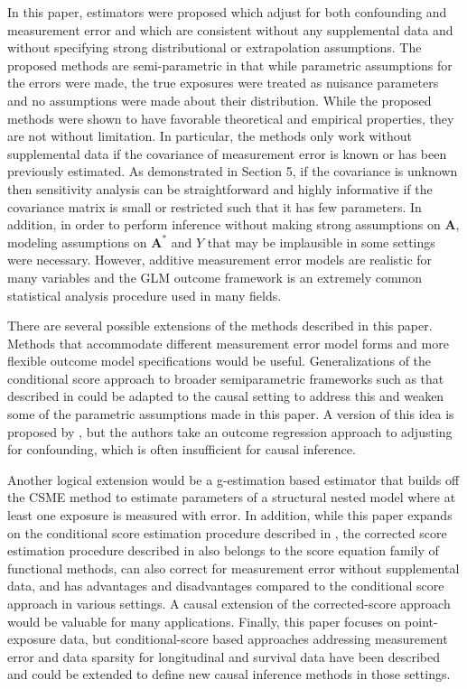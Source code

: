 \documentclass[useAMS,usenatbib,referee]{biom}
\begin{document}
In this paper, estimators were proposed which adjust for both confounding and measurement error and which are consistent without any supplemental data and without specifying strong distributional or extrapolation assumptions. The proposed methods are semi-parametric in that while parametric assumptions for the errors were made, the true exposures were treated as nuisance parameters and no assumptions were made about their distribution. While the proposed methods were shown to have favorable theoretical and empirical properties, they are not without limitation. In particular, the methods only work without supplemental data if the covariance of measurement error is known or has been previously estimated. As demonstrated in Section 5, if the covariance is unknown then sensitivity analysis can be straightforward and highly informative if the covariance matrix is small or restricted such that it has few parameters. In addition, in order to perform inference without making strong assumptions on $\bm{A}$, modeling assumptions on $\bm{A}^{*}$ and $Y$ that may be implausible in some settings were necessary. However, additive measurement error models are realistic for many variables and the GLM outcome framework is an extremely common statistical analysis procedure used in many fields.

There are several possible extensions of the methods described in this paper. Methods that accommodate different measurement error model forms and more flexible outcome model specifications would be useful. Generalizations of the conditional score approach to broader semiparametric frameworks such as that described in \citet{tsiatis2004} could be adapted to the causal setting to address this and weaken some of the parametric assumptions made in this paper. A version of this idea is proposed by \citet{liu2017}, but the authors take an outcome regression approach to adjusting for confounding, which is often insufficient for causal inference.

Another logical extension would be a g-estimation based estimator that builds off the CSME method to estimate parameters of a structural nested model where at least one exposure is measured with error. In addition, while this paper expands on the conditional score estimation procedure described in \citet{stefanski1987}, the corrected score estimation procedure described in \citet{nakamura1990} also belongs to the score equation family of functional methods, can also correct for measurement error without supplemental data, and has advantages and disadvantages compared to the conditional score approach in various settings. A causal extension of the corrected-score approach would be valuable for many applications. Finally, this paper focuses on point-exposure data, but conditional-score based approaches addressing measurement error and data sparsity for longitudinal and survival data have been described and could be extended to define new causal inference methods in those settings.
\end{document}
